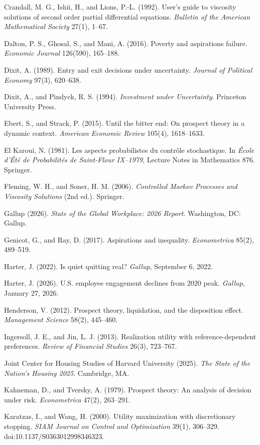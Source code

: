 Crandall, M. G., Ishii, H., and Lions, P.-L. (1992). User's guide to viscosity solutions of second order partial differential equations. \emph{Bulletin of the American Mathematical Society} 27(1), 1--67.

Dalton, P. S., Ghosal, S., and Mani, A. (2016). Poverty and aspirations failure. \emph{Economic Journal} 126(590), 165--188.

Dixit, A. (1989). Entry and exit decisions under uncertainty. \emph{Journal of Political Economy} 97(3), 620--638.

Dixit, A., and Pindyck, R. S. (1994). \emph{Investment under Uncertainty}. Princeton University Press.

Ebert, S., and Strack, P. (2015). Until the bitter end: On prospect theory in a dynamic context. \emph{American Economic Review} 105(4), 1618--1633.

El Karoui, N. (1981). Les aspects probabilistes du contr\^ole stochastique. In \emph{\'Ecole d'\'Et\'e de Probabilit\'es de Saint-Flour IX--1979}, Lecture Notes in Mathematics 876. Springer.

Fleming, W. H., and Soner, H. M. (2006). \emph{Controlled Markov Processes and Viscosity Solutions} (2nd ed.). Springer.

Gallup (2026). \emph{State of the Global Workplace: 2026 Report}. Washington, DC: Gallup.

Genicot, G., and Ray, D. (2017). Aspirations and inequality. \emph{Econometrica} 85(2), 489--519.

Harter, J. (2022). Is quiet quitting real? \emph{Gallup}, September 6, 2022.

Harter, J. (2026). U.S. employee engagement declines from 2020 peak. \emph{Gallup}, January 27, 2026.

Henderson, V. (2012). Prospect theory, liquidation, and the disposition effect. \emph{Management Science} 58(2), 445--460.

Ingersoll, J. E., and Jin, L. J. (2013). Realization utility with reference-dependent preferences. \emph{Review of Financial Studies} 26(3), 723--767.

Joint Center for Housing Studies of Harvard University (2025). \emph{The State of the Nation's Housing 2025}. Cambridge, MA.

Kahneman, D., and Tversky, A. (1979). Prospect theory: An analysis of decision under risk. \emph{Econometrica} 47(2), 263--291.

Karatzas, I., and Wang, H. (2000). Utility maximization with discretionary stopping. \emph{SIAM Journal on Control and Optimization} 39(1), 306--329. doi:10.1137/S0363012998346323.

